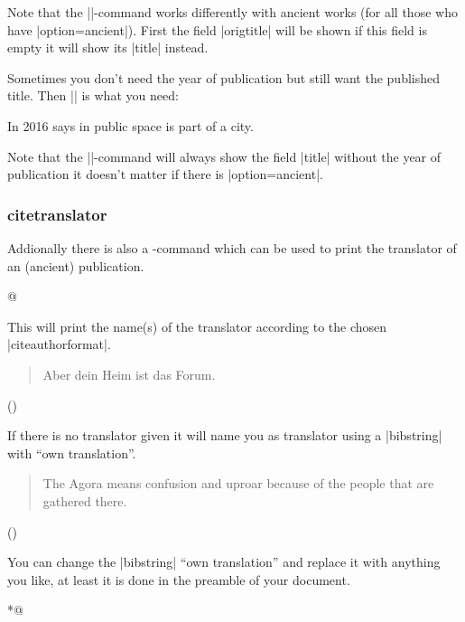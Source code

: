 \documentclass[a4paper,
10pt,
greek,
french,
spanish,
italian,
ngerman,
english,
]{ltxdoc}
\begin{document}
Note that the |\citetitle|-command works differently with ancient works (for all those who have  |option={ancient}|). 
First the field |origtitle| will be shown if this field is empty it will show its |title| instead. 

\DescribeMacro{\citetitle*}
Sometimes you don’t need the year of publication but still want the published title. 
Then |\citetitle*| is what you need:
\begin{example}
In 2016  \citeauthor{Osland2016} says in  
public space is part of a city.
\end{example}

Note that the |\citetitle*|-command will always show the field |title| without the year of publication it doesn’t matter if there is |option={ancient}|.

\subsubsection{citetranslator}
\DescribeMacro{\citetranslator}\label{citetranslator}%
Addionally there is also a -command which can be used to print the translator of an (ancient) publication.
\begin{code}
\citetranslator*@%
\end{code}
This will print the name(s) of the translator according to the chosen |citeauthorformat|.

\begin{example}
\blockcquote[12,25,1]{Cic:Att}{Aber dein Heim ist das Forum.} ()
\end{example}
If there is no translator given it will name you as translator using a |bibstring| with \enquote{own translation}.
\begin{example}
\blockcquote[3,62,1]{Artem}{The Agora means confusion and uproar because of the people that are gathered there.} ()
\end{example}
You can change the |bibstring| \enquote{own translation} and replace it with anything you like, 
at least it is done in the preamble of your document.
\begin{code}
\end{code}



\DescribeMacro{\citetranslator*}
\begin{code}
\citetranslator* *@%
\end{code} 
\end{document}
